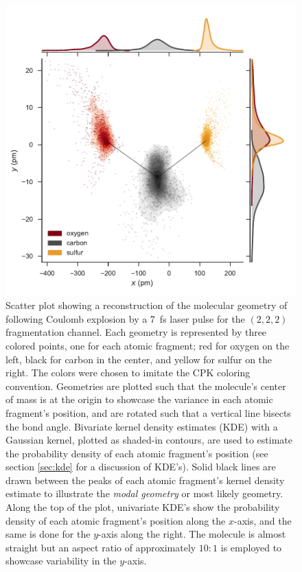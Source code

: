 \begin{figure}
  \centering
  \includegraphics[width=\textwidth]{Plots/OCS2227fsMOGeometry}
  \caption[Scatter plot showing a reconstruction of the molecular geometry of  following Coulomb explosion by a \SI{7}{\fs} laser pulse for the $(2,2,2)$ fragmentation channel.]
  {Scatter plot showing a reconstruction of the molecular geometry of  following Coulomb explosion by a \SI{7}{\fs} laser pulse for the $(2,2,2)$ fragmentation channel. Each geometry is represented by three colored points, one for each atomic fragment; red for oxygen on the left, black for carbon in the center, and yellow for sulfur on the right. The colors were chosen to imitate the CPK coloring convention. Geometries are plotted such that the molecule's center of mass is at the origin to showcase the variance in each atomic fragment's position, and are rotated such that a vertical line bisects the  bond angle. Bivariate kernel density estimates (KDE) with a Gaussian kernel, plotted as shaded-in contours, are used to estimate the probability density of each atomic fragment's position (see section \ref{sec:kde} for a discussion of KDE's). Solid black lines are drawn between the peaks of each atomic fragment's kernel density estimate to illustrate the \emph{modal geometry} or most likely geometry. Along the top of the plot, univariate KDE's show the probability density of each atomic fragment's position along the $x$-axis, and the same is done for the $y$-axis along the right. The molecule is almost straight but an aspect ratio of approximately $10:1$ is employed to showcase variability in the $y$-axis.}
  \label{fig:OCS2227fsMOGeometry}
\end{figure}

